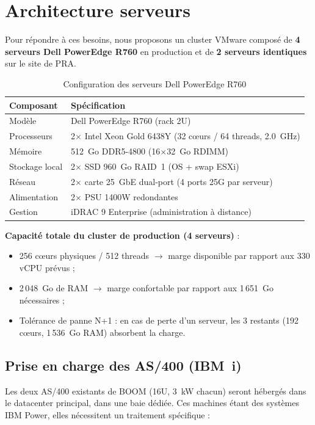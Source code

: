 \documentclass[12pt,a4paper]{report}
\begin{document}
\section{Architecture serveurs}

Pour répondre à ces besoins, nous proposons un cluster VMware composé de \textbf{4 serveurs Dell PowerEdge R760} en production et de \textbf{2 serveurs identiques} sur le site de PRA.

\begin{table}[H]
\centering
\begin{tabularx}{\textwidth}{L{4cm}L{9cm}}
\toprule
\textbf{Composant} & \textbf{Spécification} \\
\midrule
Modèle & Dell PowerEdge R760 (rack 2U) \\
Processeurs & 2$\times$ Intel Xeon Gold 6438Y (32 c\oe urs / 64 threads, 2.0~GHz) \\
Mémoire & 512~Go DDR5-4800 (16$\times$32~Go RDIMM) \\
Stockage local & 2$\times$ SSD 960~Go RAID~1 (OS + swap ESXi) \\
Réseau & 2$\times$ carte 25~GbE dual-port (4 ports 25G par serveur) \\
Alimentation & 2$\times$ PSU 1400W redondantes \\
Gestion & iDRAC 9 Enterprise (administration à distance) \\
\bottomrule
\end{tabularx}
\caption{Configuration des serveurs Dell PowerEdge R760}
\label{tab:serveurs}
\end{table}

\textbf{Capacité totale du cluster de production (4 serveurs)} :
\begin{itemize}
\item 256 c\oe urs physiques / 512 threads $\rightarrow$ marge disponible par rapport aux 330 vCPU prévus ;
\item 2\,048~Go de RAM $\rightarrow$ marge confortable par rapport aux 1\,651~Go nécessaires ;
\item Tolérance de panne N+1 : en cas de perte d'un serveur, les 3 restants (192 c\oe urs, 1\,536~Go RAM) absorbent la charge.
\end{itemize}

\subsection{Prise en charge des AS/400 (IBM~i)}

Les deux AS/400 existants de BOOM (16U, 3~kW chacun) seront hébergés dans le datacenter principal, dans une baie dédiée. Ces machines étant des systèmes IBM Power, elles nécessitent un traitement spécifique :
\end{document}
